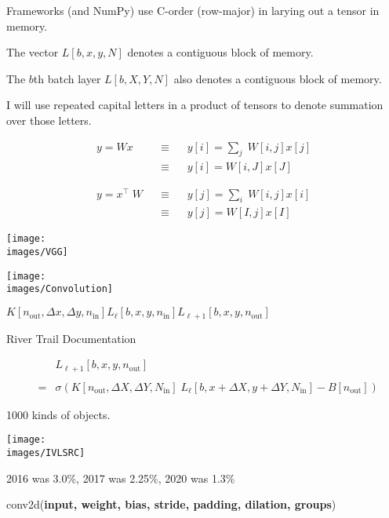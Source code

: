 {

Frameworks (and NumPy) use C-order (row-major) in larying out a tensor in memory.

\vfill
The vector $L[b,x,y,N]$ denotes a contiguous block of memory.

\vfill
The $b$th batch layer $L[b,X,Y,N]$ also denotes a contiguous block of memory.

I will use repeated capital letters in a product of tensors to denote summation over those letters.

\vfill
\begin{eqnarray*}
y = Wx &\;\;\;\equiv\;\;\; & y[i] = \sum_j \;W[i,j]x[j] \\
& \;\;\;\equiv \;\;\; & y[i] = W[i,J]x[J] \\
\\
\\
y = x^\top\;W & \;\;\;\equiv \;\;\; & y[j] = \sum_i \;W[i,j]x[i] \\
& \;\;\;\equiv \;\;\; & y[j] = W[I,j]x[I]
\end{eqnarray*}

\vfill
\centerline{\texttt{[image: \\images/VGG]}}

\newcommand{\nin}{n_{\mathrm{in}}}
\newcommand{\nout}{n_{\mathrm{out}}}

\centerline{\texttt{[image: \\images/Convolution]}}
\centerline{$K[\nout,\Delta x,\Delta y,\nin]$\hspace{6ex}$L_{{\ell}}[b,x,y,\nin]$\hspace{6ex}$L_{{\ell+1}}[b,x,y,\nout]$}
\centerline{\large River Trail Documentation}

\begin{eqnarray*}
 & &  L_{{\ell+1}}[b,x,y,\nout] \\
 \\
  & = &   \sigma\left(K[\nout,\Delta X, \Delta Y,N_{\mathrm{in}}]\; L_{{\ell}}[b,x + \Delta X, y + \Delta Y, N_{\mathrm{in}}] - B[\nout]\right)
\end{eqnarray*}


1000 kinds of objects.

\vfill
\centerline{\texttt{[image: \\images/IVLSRC]}}
2016 was 3.0\%, 2017 was 2.25\%, 2020 was 1.3\%


conv2d({\bf input, weight, bias, stride, padding, dilation, groups})

}
